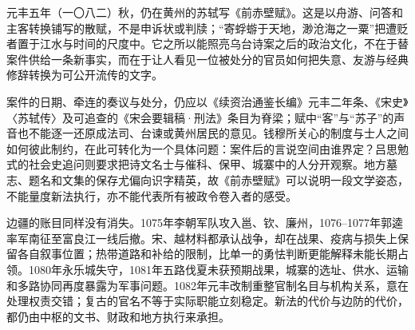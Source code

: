 元丰五年（一〇八二）秋，仍在黄州的苏轼写《前赤壁赋》。这是以舟游、问答和主客转换铺写的散赋，不是申诉状或判牍；“寄蜉蝣于天地，渺沧海之一粟”把遭贬者置于江水与时间的尺度中。它之所以能照亮乌台诗案之后的政治文化，不在于替案件供给一条新事实，而在于让人看见一位被处分的官员如何把失意、友游与经典修辞转换为可公开流传的文字。

案件的日期、牵连的奏议与处分，仍应以《续资治通鉴长编》元丰二年条、《宋史》〈苏轼传〉及可追查的《宋会要辑稿·刑法》条目为脊梁；赋中“客”与“苏子”的声音也不能逐一还原成法司、台谏或黄州居民的意见。钱穆所关心的制度与士人之间如何彼此制约，在此可转化为一个具体问题：案件后的言说空间由谁界定？吕思勉式的社会史追问则要求把诗文名士与催科、保甲、城寨中的人分开观察。地方墓志、题名和文集的保存尤偏向识字精英，故《前赤壁赋》可以说明一段文学姿态，不能量度新法执行，亦不能代表所有被政令卷入者的感受。

边疆的账目同样没有消失。1075年李朝军队攻入邕、钦、廉州，1076--1077年郭逵率军南征至富良江一线后撤。宋、越材料都承认战争，却在战果、疫病与损失上保留各自叙事位置；热带道路和补给的限制，比单一的勇怯判断更能解释未能长期占领。1080年永乐城失守，1081年五路伐夏未获预期战果，城寨的选址、供水、运输和多路协同再度暴露为军事问题。1082年元丰改制重整官制名目与机构关系，意在处理权责交错；复古的官名不等于实际职能立刻稳定。新法的代价与边防的代价，都仍由中枢的文书、财政和地方执行来承担。
